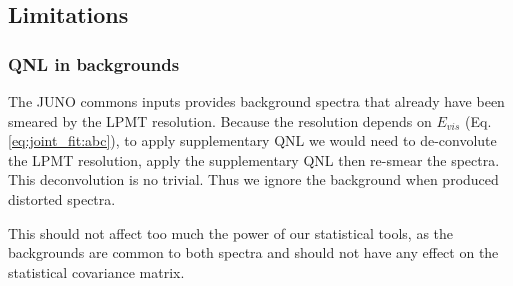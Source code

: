 \documentclass[../main.tex]{subfiles}
\begin{document}
%
%
%
%

\subsection{Limitations}

\subsubsection{QNL in backgrounds}

The JUNO commons inputs provides background spectra that already have been smeared by the LPMT resolution. Because the resolution depends on $E_{vis}$ (Eq. \ref{eq:joint_fit:abc}), to apply supplementary QNL we would need to de-convolute the LPMT resolution, apply the supplementary QNL then re-smear the spectra. This deconvolution is no trivial. Thus we ignore the background when produced distorted spectra.

This should not affect too much the power of our statistical tools, as the backgrounds are common to both spectra and should not have any effect on the statistical covariance matrix.
\end{document}
